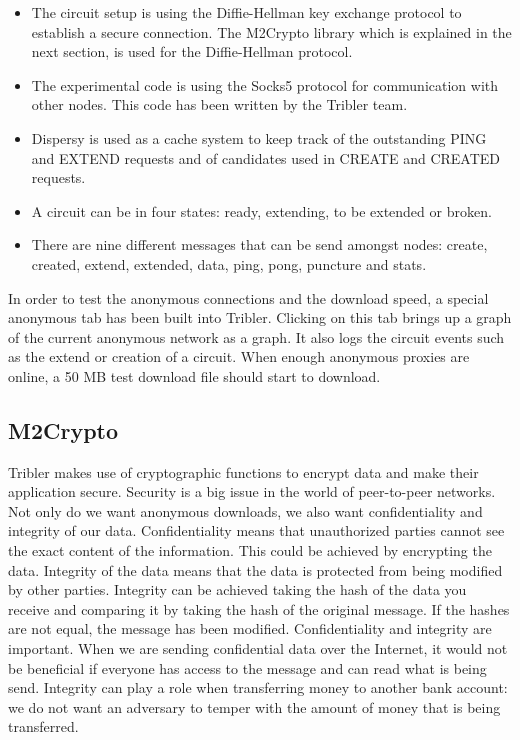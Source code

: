 			\begin{itemize} 
				\item The circuit setup is using the Diffie-Hellman key exchange protocol to establish a secure connection. The M2Crypto library which is explained in the next section, is used for the Diffie-Hellman protocol.
				\item The experimental code is using the Socks5 protocol for communication with other nodes. This code has been written by the Tribler team.
				\item Dispersy is used as a cache system to keep track of the outstanding PING and EXTEND requests and of candidates used in CREATE and CREATED requests.
				\item A circuit can be in four states: ready, extending, to be extended or broken.
				\item There are nine different messages that can be send amongst nodes: create, created, extend, extended, data, ping, pong, puncture and stats.
			\end{itemize}
			
			In order to test the anonymous connections and the download speed, a special anonymous tab has been built into Tribler. Clicking on this tab brings up a graph of the current anonymous network as a graph. It also logs the circuit events such as the extend or creation of a circuit. When enough anonymous proxies are online, a 50 MB test download file should start to download.

	\subsection{M2Crypto}
		Tribler makes use of cryptographic functions to encrypt data and make their application secure. Security is a big issue in the world of peer-to-peer networks. Not only do we want anonymous downloads, we also want confidentiality and integrity of our data. Confidentiality means that unauthorized parties cannot see the exact content of the information. This could be achieved by encrypting the data. Integrity of the data means that the data is protected from being modified by other parties. Integrity can be achieved taking the hash of the data you receive and comparing it by taking the hash of the original message. If the hashes are not equal, the message has been modified. Confidentiality and integrity are important. When we are sending confidential data over the Internet, it would not be beneficial if everyone has access to the message and can read what is being send. Integrity can play a role when transferring money to another bank account: we do not want an adversary to temper with the amount of money that is being transferred.
		
